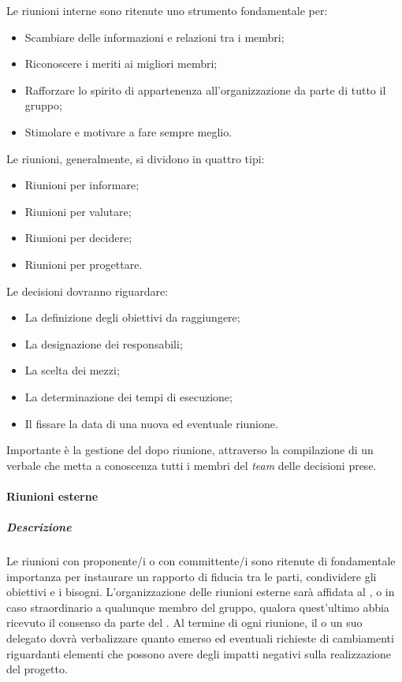 Le riunioni interne sono ritenute uno strumento fondamentale per:
\begin{itemize}
\item
Scambiare delle informazioni e relazioni tra i membri;
\item
Riconoscere i meriti ai migliori membri;
\item
Rafforzare lo spirito di appartenenza all'organizzazione da parte di tutto il gruppo;
\item
Stimolare e motivare a fare sempre meglio.
\end{itemize}

Le riunioni, generalmente, si dividono in quattro tipi:
\begin{itemize}
\item
Riunioni per informare;
\item
Riunioni per valutare;
\item
Riunioni per decidere;
\item
Riunioni per progettare.
\end{itemize}

Le decisioni dovranno riguardare:
\begin{itemize}
\item
La definizione degli obiettivi da raggiungere;
\item
La designazione dei responsabili;
\item
La scelta dei mezzi;
\item
La determinazione dei tempi di esecuzione;
\item
Il fissare la data di una nuova ed eventuale riunione.
\end{itemize}

Importante è la gestione del dopo riunione, attraverso la compilazione di un verbale che metta a conoscenza tutti i membri del \textit{team} delle decisioni prese.

\paragraph{Riunioni esterne}
\subparagraph{Descrizione}
Le riunioni con proponente/i o con committente/i sono ritenute di fondamentale importanza per instaurare un rapporto di fiducia tra le parti, condividere gli obiettivi e i bisogni.
L'organizzazione delle riunioni esterne sarà affidata al \textit{\RdP}, o in caso straordinario a qualunque membro del gruppo, qualora quest'ultimo abbia ricevuto il consenso da parte del \textit{\RdP}.
Al termine di ogni riunione, il \textit{\RdP} o un suo delegato dovrà verbalizzare quanto emerso ed eventuali richieste di cambiamenti riguardanti elementi che possono avere degli impatti negativi sulla realizzazione del progetto.


